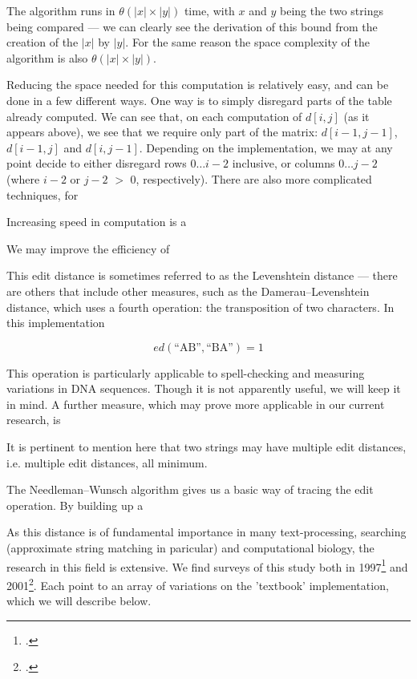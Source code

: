 \documentclass[a4paper,11pt,twoside,notitlepage]{article}
\renewcommand{\cite}[1]{\footcite{#1}}
\begin{document}
        The algorithm runs in $\theta (|x| \times |y|)$ time, with $x$ and
        $y$ being the two strings being compared --- we can clearly
        see the derivation of this bound from the creation of the
        $|x|$ by $|y|$. For the same reason the space complexity of
        the algorithm is also $\theta (|x| \times |y|)$.

        Reducing the space needed for this computation is relatively
        easy, and can be done in a few different ways. One way is to
        simply disregard parts of the table already computed. We can
        see that, on each computation of $d[i,j]$ (as it appears
        above), we see that we require only part of the matrix:
        $d[i-1,j-1]$, $d[i-1,j]$ and $d[i,j-1]$. Depending on the
        implementation, we may at any point decide to either disregard
        rows $0 \dots i-2$ inclusive, or columns $0 \dots j-2$ (where
        $i-2$ or $j-2$ $>$ $0$, respectively). There are also more
        complicated techniques, for 

        Increasing speed in computation is a

        We may improve the efficiency of  

        This edit distance is sometimes referred to as the Levenshtein
        distance --- there are others that include other measures,
        such as the Damerau–Levenshtein distance, which uses a fourth
        operation: the transposition of two characters. In this
        implementation

        $$ ed(\text{``AB''},\text{``BA''}) = 1$$

        This operation is particularly applicable to spell-checking
        and measuring variations in DNA sequences. Though it is not
        apparently useful, we will keep it in mind. A further measure,
        which may prove more applicable in our current research, is 

        It is pertinent to mention here that two strings may have
        multiple edit distances, i.e. multiple edit distances, all
        minimum. 

        The Needleman–Wunsch algorithm gives us a basic way of tracing
        the edit operation. By building up a 

        

        As this distance is of
        fundamental importance in many text-processing, searching
        (approximate string matching in paricular) and computational
        biology, the research in this field is extensive. We find
        surveys of this study both in 1997\cite{Gusfield1997} and
        2001\cite{Navarro2001}. Each point to an array of variations
        on the 'textbook' implementation, which we will describe
        below.
        
\end{document}
